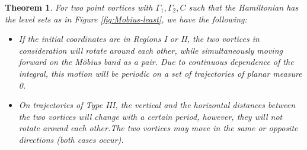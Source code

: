 \documentclass[11pt,twoside]{article}
\newtheorem{theorem}{Theorem}[section]
\theoremstyle{definition}
\numberwithin{equation}{section}
\begin{document}
\begin{theorem}
\label{st: two vortex motion on Mobius band}
For two point vortices with $\Gamma_1,\Gamma_2,C$ such that the Hamiltonian has the level sets as in Figure \ref{fig:Mobius-least}, %
we have the following:
\begin{itemize}
       \item If the initial coordinates are  in  Regions I or II, the  two vortices in consideration will rotate around each other, while simultaneously moving forward on the M\"obius band as a pair. Due to continuous dependence of the integral, this motion will be periodic on a set of trajectories of planar measure 0.
       \item On trajectories of Type III, the vertical and the horizontal distances between the two vortices will change with a certain period, however, they will not rotate around each other.The two vortices may move in the same or opposite directions (both cases occur). \end{itemize}
\end{theorem}
\end{document}
